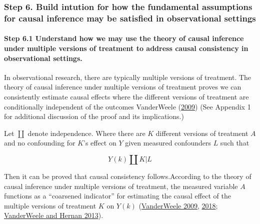 \documentclass[
  singlecolumn]{article}
\let\oldparagraph\paragraph
\renewcommand{\paragraph}[1]{\oldparagraph{#1}\mbox{}}
\begin{document}
\hypertarget{step-6.-build-intution-for-how-the-fundamental-assumptions-for-causal-inference-may-be-satisfied-in-observational-settings}{%
\subsubsection{Step 6. Build intution for how the fundamental
assumptions for causal inference may be satisfied in observational
settings}\label{step-6.-build-intution-for-how-the-fundamental-assumptions-for-causal-inference-may-be-satisfied-in-observational-settings}}

\hypertarget{step-6.1-understand-how-we-may-use-the-theory-of-causal-inference-under-multiple-versions-of-treatment-to-address-causal-consistency-in-observational-settings.}{%
\paragraph{\texorpdfstring{\textbf{Step 6.1 Understand how we may use
the theory of causal inference under multiple versions of treatment to
address causal consistency in observational
settings}.}{Step 6.1 Understand how we may use the theory of causal inference under multiple versions of treatment to address causal consistency in observational settings.}}\label{step-6.1-understand-how-we-may-use-the-theory-of-causal-inference-under-multiple-versions-of-treatment-to-address-causal-consistency-in-observational-settings.}}

In observational research, there are typically multiple versions of
treatment. The theory of causal inference under multiple versions of
treatment proves we can consistently estimate causal effects where the
different versions of treatment are conditionally independent of the
outcomes VanderWeele (\protect\hyperlink{ref-vanderweele2009}{2009})
(See Appendix 1 for additional discussion of the proof and its
implications.)

Let \(\coprod\) denote independence. Where there are \(K\) different
versions of treatment \(A\) and no confounding for \(K\)'s effect on
\(Y\) given measured confounders \(L\) such that

\[
Y(k) \coprod K | L
\]

Then it can be proved that causal consistency follows.According to the
theory of causal inference under multiple versions of treatment, the
measured variable \(A\) functions as a ``coarsened indicator'' for
estimating the causal effect of the multiple versions of treatment \(K\)
on \(Y(k)\) (\protect\hyperlink{ref-vanderweele2009}{VanderWeele 2009},
\protect\hyperlink{ref-vanderweele2018}{2018};
\protect\hyperlink{ref-vanderweele2013}{VanderWeele and Hernan 2013}).
\end{document}
